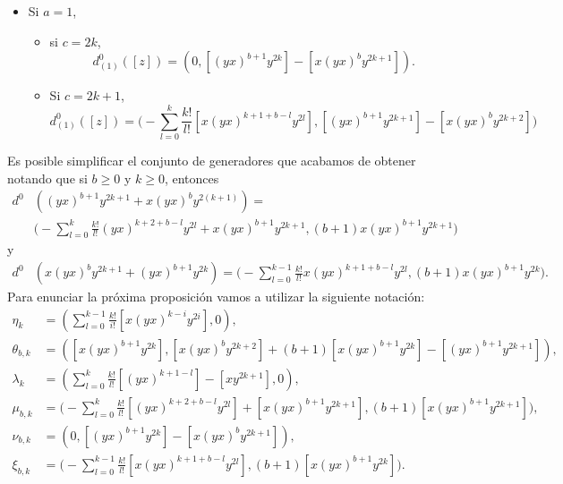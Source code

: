 \documentclass[fleqn,../tesis.tex]{subfiles}
\begin{document}
\begin{itemize}
\begin{itemize}
     \end{itemize}
     \item Si $a = 1$,
     \begin{itemize}
          \item si $c = 2k$,
          \[
               d^{0}_{(1)}([z]) = \left(0, \left[(yx)^{b + 1}y^{2k}\right] - \left[x(yx)^by^{2k + 1}\right] \right).          
          \]
          \item Si $c = 2k + 1$,
          \[
              d^{0}_{(1)}([z]) = \Bigg(-\sum_{l = 0}^{k}\frac{k!}{l!}\left[x(yx)^{k + 1 + b - l}y^{2l}\right],
                  \left[(yx)^{b + 1}y^{2k + 1}\right] - \left[x(yx)^{b}y^{2k + 2}\right]\Bigg)
          \]      
     \end{itemize}
\end{itemize}
Es posible simplificar el conjunto de generadores que acabamos de obtener notando que si $b \geq 0$ y $k \geq 0$, entonces
\begin{align*}
    d^{0}&\left((yx)^{b + 1}y^{2k + 1} + x(yx)^{b}y^{2(k + 1)}\right) = \\
    & \Bigg(-\sum_{l = 0}^{k}\frac{k!}{l!}(yx)^{k + 2 + b - l}y^{2l}
                    + x(yx)^{b + 1}y^{2k + 1}, (b + 1) x(yx)^{b + 1}y^{2k + 1}\Bigg)
\end{align*}
y
\begin{align*}
    d^{0}&\left(x(yx)^by^{2k + 1} + (yx)^{b + 1}y^{2k}\right) = \Bigg(-\sum_{l = 0}^{k - 1}\frac{k!}{l!}x(yx)^{k + 1 + b - l}y^{2l},
                  (b + 1)x(yx)^{b + 1}y^{2k}\Bigg).
\end{align*}
Para enunciar la próxima proposición vamos a utilizar la siguiente notación:
\begin{align*}
    \eta_k &= \left(\sum_{l = 0}^{k - 1}\frac{k!}{i!}\left[x(yx)^{k -i}y^{2i}\right], 0\right),\\
    \theta_{b,k} &= \left(\left[x(yx)^{b + 1}y^{2k}\right], \left[x(yx)^{b}y^{2k + 2}\right] + (b + 1)\left[x(yx)^{b  + 1}y^{2k}\right] 
        - \left[(yx)^{b + 1}y^{2k + 1}\right]\right),\\
    \lambda_{k} &= \left(\sum_{l = 0}^{k}\frac{k!}{l!}\left[(yx)^{k + 1 - l}\right] - \left[xy^{2k + 1}\right], 0\right),\\
    \mu_{b, k} &= \Bigg(-\sum_{l = 0}^{k}\frac{k!}{l!}\left[(yx)^{k + 2 + b - l}y^{2l}\right]
                    + \left[x(yx)^{b + 1}y^{2k + 1}\right], (b + 1) \left[x(yx)^{b + 1}y^{2k + 1}\right]\Bigg),\\
    \nu_{b , k} &=\left(0, \left[(yx)^{b + 1}y^{2k}\right] - \left[x(yx)^{b}y^{2k + 1}\right]\right),\\
    \xi_{b, k} &= \Bigg(-\sum_{l = 0}^{k - 1}\frac{k!}{l!}\left[x(yx)^{k + 1 + b - l}y^{2l}\right],
                  (b + 1)\left[x(yx)^{b + 1}y^{2k}\right]\Bigg).
\end{align*}
\end{document}
